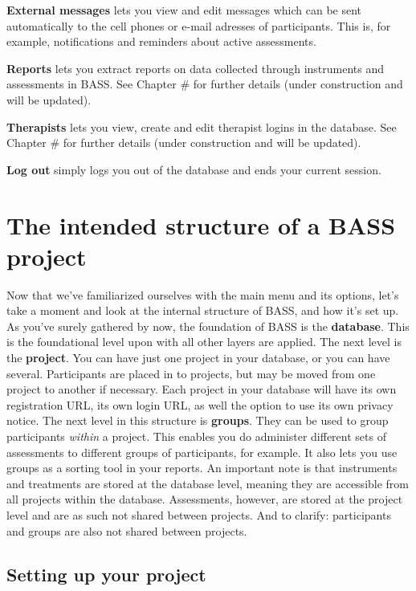 \documentclass[]{book}
\begin{document}
\textbf{External messages} lets you view and edit messages which can be sent automatically to the cell phones or e-mail adresses of participants. This is, for example, notifications and reminders about active assessments.

\textbf{Reports} lets you extract reports on data collected through instruments and assessments in BASS. See Chapter \# for further details (under construction and will be updated).

\textbf{Therapists} lets you view, create and edit therapist logins in the database. See Chapter \# for further details (under construction and will be updated).

\textbf{Log out} simply logs you out of the database and ends your current session.

\hypertarget{the-intended-structure-of-a-bass-project}{%
\section{The intended structure of a BASS project}\label{the-intended-structure-of-a-bass-project}}

Now that we've familiarized ourselves with the main menu and its options, let's take a moment and look at the internal structure of BASS, and how it's set up.
As you've surely gathered by now, the foundation of BASS is the \textbf{database}. This is the foundational level upon with all other layers are applied. The next level is the \textbf{project}. You can have just one project in your database, or you can have several. Participants are placed in to projects, but may be moved from one project to another if necessary. Each project in your database will have its own registration URL, its own login URL, as well the option to use its own privacy notice.
The next level in this structure is \textbf{groups}. They can be used to group participants \emph{within} a project. This enables you do administer different sets of assessments to different groups of participants, for example. It also lets you use groups as a sorting tool in your reports.
An important note is that instruments and treatments are stored at the database level, meaning they are accessible from all projects within the database. Assessments, however, are stored at the project level and are as such not shared between projects.
And to clarify: participants and groups are also not shared between projects.

\hypertarget{setting-up-your-project}{%
\subsection{Setting up your project}\label{setting-up-your-project}}
\end{document}
